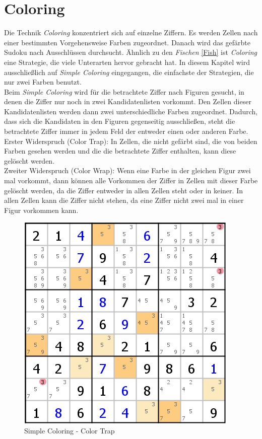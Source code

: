 \newpage
\section{Coloring}
Die Technik \textit{Coloring} konzentriert sich auf einzelne Ziffern. Es werden Zellen nach einer bestimmten Vorgehensweise Farben zugeordnet. Danach wird das gefärbte Sudoku nach Ausschlüssen durchsucht. Ähnlich zu den \textit{Fischen} \ref{Fish} ist \textit{Coloring} eine Strategie, die viele Unterarten hervor gebracht hat. In diesem Kapitel wird ausschließlich auf \textit{Simple Coloring} eingegangen, die einfachste der Strategien, die nur zwei Farben benutzt.\\
Beim \textit{Simple Coloring} wird für die betrachtete Ziffer nach Figuren gesucht, in denen die Ziffer nur noch in zwei Kandidatenlisten vorkommt. Den Zellen dieser Kandidatenlisten werden dann zwei unterschiedliche Farben zugeordnet. Dadurch, dass sich die Kandidaten in den Figuren gegenseitig ausschließen, steht die betrachtete Ziffer immer in jedem Feld der entweder einen oder anderen Farbe.\\ 
Erster Widerspruch (Color Trap): In Zellen, die nicht gefärbt sind, die von beiden Farben gesehen werden und die die betrachtete Ziffer enthalten, kann diese gelöscht werden.\\
Zweiter Widerspruch (Color Wrap): Wenn eine Farbe in der gleichen Figur zwei mal vorkommt, dann können alle Vorkommen der Ziffer in Zellen mit dieser Farbe gelöscht werden, da die Ziffer entweder in allen Zellen steht oder in keiner. In allen Zellen kann die Ziffer nicht stehen, da eine Ziffer nicht zwei mal in einer Figur vorkommen kann.

\begin{figure}[h]
\begin{center}
\includegraphics{./img/simple_coloring.png}
\caption{Simple Coloring - Color Trap}
\end{center}
\end{figure}

